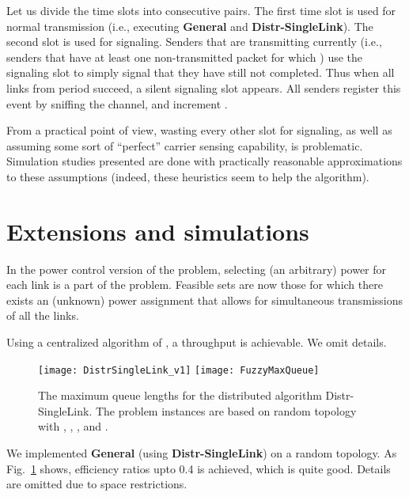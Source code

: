 \documentclass[11pt]{amsart}
\newcommand{\alg}[1]{\textbf{#1}}
\begin{document}
Let us divide the time slots into consecutive pairs.  The first time
slot is used for normal transmission (i.e., executing \alg{General}
and \alg{Distr-SingleLink}).  The second slot is used for
signaling. Senders that are transmitting currently (i.e., senders that
have at least one non-transmitted packet  for which ) use
the signaling slot to simply signal that they have still not
completed.  Thus when all links from period  succeed, a silent
signaling slot appears.  All senders register this event by sniffing
the channel, and increment .

From a practical point of view, wasting every other slot for
signaling, as well as assuming some sort of ``perfect'' carrier sensing
capability, is problematic. 
Simulation studies presented are done
with practically reasonable approximations to these
assumptions (indeed, these heuristics seem to help the algorithm). 























\section{Extensions and simulations}
\label{sec:pc}
In the power control version of the problem, selecting (an arbitrary) power for
each link is a part of the problem.
Feasible sets are now those for which there exists an (unknown) power
assignment that allows for simultaneous transmissions of all the links.

Using a centralized algorithm of \cite{KesselheimSoda11}, a  throughput is achievable.
We omit details.







\begin{figure}
\begin{center}
\texttt{[image: DistrSingleLink\_v1]}
\texttt{[image: FuzzyMaxQueue]}
\caption{The maximum queue lengths for the distributed algorithm Distr-SingleLink.   The problem instances are based on random topology with , , ,  and .} \label{fig:maxqueue}
\end{center}
\end{figure}

We implemented \alg{General} (using \alg{Distr-SingleLink}) on a random topology. As Fig.~\ref{fig:maxqueue} shows, efficiency ratios upto 0.4 is achieved, which is quite good. Details are omitted due to space restrictions.







		
\end{document}

